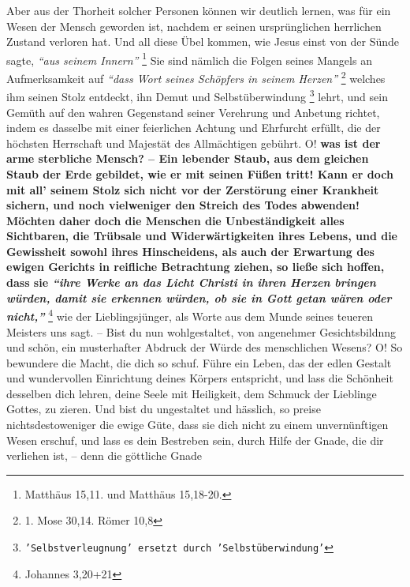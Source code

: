 Aber aus der Thorheit solcher Personen können wir deutlich lernen, was für ein
Wesen der Mensch geworden ist, nachdem er seinen ursprünglichen herrlichen
Zustand verloren hat. Und all diese Übel kommen, wie Jesus einst von der
Sünde
sagte,
\textit{"`aus seinem Innern"'}
\footnote{Matthäus 15,11. und Matthäus 15,18-20.}
Sie sind nämlich
die Folgen seines Mangels an Aufmerksamkeit auf
\textit{"`dass Wort seines Schöpfers in
seinem Herzen"'}
\footnote{1. Mose 30,14. Römer 10,8}
welches ihm seinen Stolz
entdeckt, ihn Demut und
Selbstüberwindung
\footnote{\texttt{'Selbstverleugnung' ersetzt durch 'Selbstüberwindung'}}
lehrt, und sein Gemüth auf den
wahren Gegenstand seiner Verehrung und Anbetung richtet, indem es dasselbe mit
einer feierlichen Achtung und Ehrfurcht erfüllt, die der höchsten Herrschaft und
Majestät des Allmächtigen gebührt. O!  
 \label{ref:11_10_juengstes_gericht}
\textbf{was ist der arme sterbliche Mensch? --
Ein lebender Staub, aus dem gleichen Staub der Erde gebildet, wie er mit seinen
Füßen tritt! Kann er doch mit all' seinem Stolz sich nicht vor der Zerstörung
einer Krankheit sichern, und noch vielweniger den Streich des Todes abwenden!
Möchten daher doch die Menschen die Unbeständigkeit alles Sichtbaren, die
Trübsale und Widerwärtigkeiten ihres Lebens, und die Gewissheit sowohl ihres
Hinscheidens, als auch der Erwartung des ewigen Gerichts in reifliche
Betrachtung ziehen, so ließe sich hoffen, dass sie
\textit{"`ihre Werke an das Licht
Christi in ihren Herzen bringen würden, damit sie erkennen würden, ob sie in Gott
getan wären oder nicht,"'} }
\footnote{Johannes 3,20+21}
wie der Lieblingsjünger, als
Worte aus dem Munde seines teueren Meisters uns sagt. -- Bist du nun
wohlgestaltet, von angenehmer Gesichtsbildnng und schön, ein musterhafter
Abdruck der Würde des menschlichen Wesens? O! So bewundere die Macht, die dich
so schuf. Führe ein Leben, das der edlen Gestalt und wundervollen Einrichtung
deines Körpers entspricht, und lass die Schönheit desselben dich lehren, deine
Seele mit Heiligkeit, dem Schmuck der
Lieblinge Gottes, zu zieren. Und bist du
ungestaltet und hässlich, so preise nichtsdestoweniger die ewige Güte, dass sie
dich nicht zu einem unvernünftigen Wesen erschuf, und lass es dein Bestreben
sein, durch Hilfe der Gnade, die dir verliehen ist, --  denn die
göttliche Gnade
